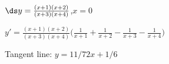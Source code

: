 {$\ds y=\frac{(x+1)(x+2)}{(x+3)(x+4)}$,\quad $x=0$
}
{$y'= \frac{(x+1)(x+2)}{(x+3)(x+4)}\big(\frac1{x+1}+\frac1{x+2}-\frac1{x+3}-\frac1{x+4}\big)$

Tangent line: $y = 11/72x+1/6$
}
